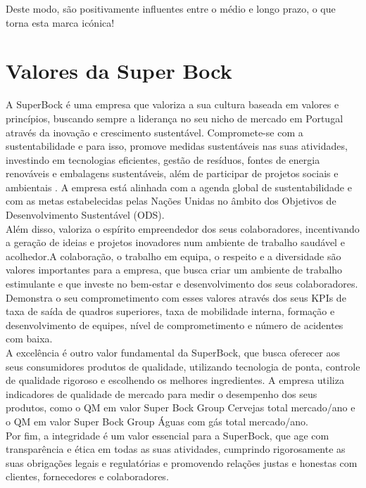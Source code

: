 Deste modo, são positivamente influentes entre o médio e longo prazo, o que torna esta marca icónica!\\ 


\section{Valores da Super Bock}
\label{Valores}
A SuperBock é uma empresa que valoriza a sua cultura baseada em valores e princípios, buscando sempre a liderança no seu nicho de mercado em Portugal através da inovação e crescimento sustentável. Compromete-se com a sustentabilidade e para isso, promove medidas sustentáveis nas suas atividades, investindo em tecnologias eficientes, gestão de resíduos, fontes de energia renováveis e embalagens sustentáveis, além de participar de projetos sociais e ambientais \cite{ref1}.
A empresa está alinhada com a agenda global de sustentabilidade e com as metas estabelecidas pelas Nações Unidas no âmbito dos Objetivos de Desenvolvimento Sustentável (ODS)\cite{ref2}. \\

Além disso, valoriza o espírito empreendedor dos seus colaboradores, incentivando a geração de ideias e projetos inovadores num ambiente de trabalho saudável e acolhedor.A colaboração, o trabalho em equipa, o respeito e a diversidade são valores importantes para a empresa, que busca criar um ambiente de trabalho estimulante e que investe no bem-estar e desenvolvimento dos seus colaboradores\cite{ref3}. Demonstra o seu comprometimento com esses valores através dos seus KPIs de taxa de saída de quadros superiores, taxa de mobilidade interna, formação e desenvolvimento de equipes, nível de comprometimento e número de acidentes com baixa\cite{ref4}.\\

A excelência é outro valor fundamental da SuperBock, que busca oferecer aos seus consumidores produtos de qualidade, utilizando tecnologia de ponta, controle de qualidade rigoroso e escolhendo os melhores ingredientes\cite{ref5}. A empresa utiliza indicadores de qualidade de mercado para medir o desempenho dos seus produtos, como o QM em valor Super Bock Group Cervejas total mercado/ano e o QM em valor Super Bock Group Águas com gás total mercado/ano\cite{ref4}.\\

Por fim, a integridade é um valor essencial para a SuperBock, que age com transparência e ética em todas as suas atividades, cumprindo rigorosamente as suas obrigações legais e regulatórias e promovendo relações justas e honestas com clientes, fornecedores e colaboradores\cite{ref4}.\\

